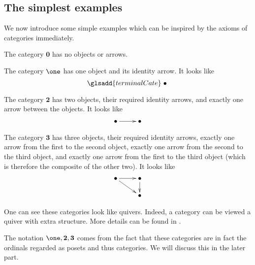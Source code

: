 \subsection{The simplest examples}
We now introduce some simple examples which can be inspired by the axioms of categories immediately.
\begin{exam}
  The category $\mathbf{0}$ has no objects or arrows.

  The category $\one$ has one object and its identity arrow. It looks like
               \begin{displaymath}\glsadd{terminalCate}
                 \xymatrix@R=0.5cm{
                    \bullet              }
               \end{displaymath}

  The category $\mathbf{2}$ has two objects, their required identity arrows, and exactly one arrow between the objects. It looks like
               \begin{displaymath}
                 \xymatrix@R=0.5cm{
                    \bullet\ar[r] & \bullet             }
               \end{displaymath}

  The category $\mathbf{3}$ has three objects, their required identity arrows, exactly one arrow from the first to the second object, exactly one arrow from the second to the third object, and exactly one arrow from the first to the third object (which is therefore the composite of the other two). It looks like
               \begin{displaymath}
                 \xymatrix@R=0.5cm{
                    \bullet\ar[r]\ar[dr] & \bullet\ar[d] \\
                    & \bullet            }
               \end{displaymath}
\end{exam}

One can see these categories look like quivers. Indeed, a category can be viewed a quiver with extra structure. More details can be found in \nlab.

The notation $\one,\mathbf{2},\mathbf{3}$ comes from the fact that these categories are in fact the ordinals regarded as posets and thus categories. We will discuss this in the later part.

